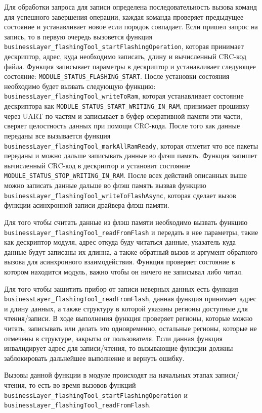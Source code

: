 Для обработки запроса для записи определена последовательность вызова команд для успешного завершения операции, каждая команда проверяет предыдущее состояние и устанавливает
новое если порядок совпадает. Если пришел запрос на запись, то в первую очередь вызовется функция \lstinline|businessLayer_flashingTool_startFlashingOperation|, которая
принимает дескриптор, адрес, куда необходимо записать, длину и вычисленный CRC-код файла. Функция записывает параметры в дескриптор и устанавливает следующее состояние:
\lstinline|MODULE_STATUS_FLASHING_START|. После установки состояния необходимо будет вызвать следующую функцию: \lstinline|businessLayer_flashingTool_writeToRam|, которая
устанавливает состояние дескриптора как \lstinline|MODULE_STATUS_START_WRITING_IN_RAM|,
принимает прошивку через UART по частям и записывает в буфер оперативной памяти эти части, сверяет целостность данных при помощи CRC-кода. После того как данные переданы все
вызывается функция \lstinline|businessLayer_flashingTool_markAllRamReady|, которая отметит что все пакеты переданы и можно дальше записывать данные во флэш память.
Функция запишет вычисленный CRC-код в дескриптор и установит состояние \lstinline|MODULE_STATUS_STOP_WRITING_IN_RAM|. После всех действий описанных выше можно записать данные
дальше во флэш память вызвав функцию \lstinline|businessLayer_flashingTool_writeToFlashAsync|, которая сделает вызов функции асинхронной записи драйвера флэш памяти.

Для того чтобы считать данные из флэш памяти необходимо вызвать функцию \lstinline|businessLayer_flashingTool_readFromFlash| и передать в нее параметры, такие как
дескриптор модуля, адрес откуда буду читаться данные, указатель куда данные будут записаны их длинна, а также обратный вызов и аргумент обратного вызова для асинхронного
взаимодействия. Функция проверяет состояние в котором находится модуль, важно чтобы он ничего не записывал либо читал.

Для того чтобы защитить прибор от записи неверных данных есть функция \lstinline|businessLayer_flashingTool_readFromFlash|, данная функция принимает
адрес и длину данных, а также структуру в которой указаны регионы доступные для чтения/записи. В ходе выполнения функция
проверяет регионы, которые можно читать, записывать или делать это одновременно, остальные регионы, которые не отмечены в структуре, закрыты от пользователя.
Если данная функция инвалидирует адрес для записи/чтения, то вызывающие функции должны заблокировать дальнейшее выполнение и вернуть ошибку.

Вызовы данной функции в модуле происходят на начальных этапах записи/чтения, то есть во время вызовов функций \lstinline|businessLayer_flashingTool_startFlashingOperation| и
\lstinline|businessLayer_flashingTool_readFromFlash|.
